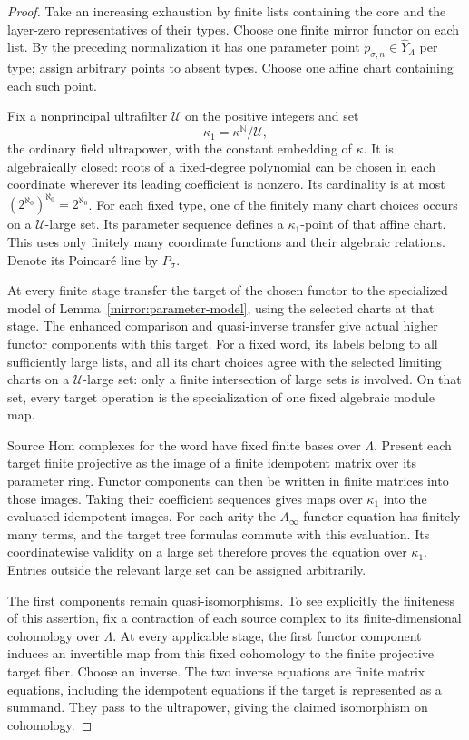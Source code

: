 \documentclass[11pt]{article}
\theoremstyle{definition}
\theoremstyle{remark}
\numberwithin{equation}{section}
\begin{document}
\begin{proof}
Take an increasing exhaustion by finite lists containing the core
and the layer-zero representatives of their types.  Choose one
finite mirror functor on each list.  By the preceding normalization
it has one parameter point $p_{\sigma,n}\in\widehat Y_\Lambda$
per type; assign arbitrary points to absent types.  Choose one
affine chart containing each such point.

Fix a nonprincipal ultrafilter $\mathcal U$ on the positive integers
and set
\[
 \kappa_1=\kappa^{\mathbb N}/\mathcal U,
\]
the ordinary field ultrapower, with the constant embedding of
$\kappa$.  It is algebraically closed: roots of a fixed-degree
polynomial can be chosen in each coordinate wherever its leading
coefficient is nonzero.  Its cardinality is at most
$(2^{\aleph_0})^{\aleph_0}=2^{\aleph_0}$.  For each fixed type,
one of the finitely many chart choices occurs on a
$\mathcal U$-large set.  Its parameter sequence defines a
$\kappa_1$-point of that affine chart.  This uses only finitely many
coordinate functions and their algebraic relations.  Denote its
Poincar\'e line by $P_\sigma$.

At every finite stage transfer the target of the chosen functor to
the specialized model of Lemma~\ref{mirror:parameter-model}, using
the selected charts at that stage.  The enhanced comparison and
quasi-inverse transfer give actual higher functor components with
this target.  For a fixed word, its labels belong to all sufficiently
large lists, and all its chart choices agree with the selected
limiting charts on a $\mathcal U$-large set: only a finite
intersection of large sets is involved.  On that set, every target
operation is the specialization of one fixed algebraic module map.

Source Hom complexes for the word have fixed finite bases over
$\Lambda$.  Present each target finite projective as the image of
a finite idempotent matrix over its parameter ring.  Functor
components can then be written in finite matrices into those
images.  Taking their coefficient sequences gives maps over
$\kappa_1$ into the evaluated idempotent images.  For each arity
the $A_\infty$ functor equation has finitely many terms, and the target
tree formulas commute with this evaluation.  Its coordinatewise
validity on a large set therefore proves the equation over
$\kappa_1$.  Entries outside the relevant large set can be assigned
arbitrarily.

The first components remain quasi-isomorphisms.  To see explicitly
the finiteness of this assertion, fix a contraction of each source
complex to its finite-dimensional cohomology over $\Lambda$.
At every applicable stage, the first functor component induces an
invertible map from this fixed cohomology to the finite projective
target fiber.  Choose an inverse.  The two inverse equations are
finite matrix equations, including the idempotent equations if
the target is represented as a summand.  They pass to the
ultrapower, giving the claimed isomorphism on cohomology.


\end{proof}
\end{document}
